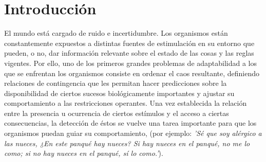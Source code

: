 
\chapter{Introducción} %

\label{Chapter1} %


\newcommand{\keyword}[1]{\textbf{#1}}
\newcommand{\tabhead}[1]{\textbf{#1}}
\newcommand{\code}[1]{\texttt{#1}}
\newcommand{\file}[1]{\texttt{\bfseries#1}}
\newcommand{\option}[1]{\texttt{\itshape#1}}


El mundo está cargado de ruido e incertidumbre. Los organismos están constantemente expuestos a distintas fuentes de estimulación en su entorno que pueden, o no, dar información relevante sobre el estado de las cosas y las reglas vigentes. Por ello, uno de los primeros grandes problemas de adaptabilidad a los que se enfrentan los organismos consiste en ordenar el caos resultante, definiendo relaciones de contingencia que les permitan hacer predicciones sobre la disponibilidad de ciertos sucesos biológicamente importantes y ajustar su comportamiento a las restricciones operantes. Una vez establecida la relación entre la presencia u ocurrencia de ciertos estímulos y el acceso a ciertas consecuencias, la detección de éstos se vuelve una tarea importante para que los organismos puedan guiar su comportamiento, (por ejemplo: \textit{'Sé que soy alérgico a las nueces, ¿En este panqué hay nueces? Si hay nueces en el panqué, no me lo como; si no hay nueces en el panqué, sí lo como.'}).\\


